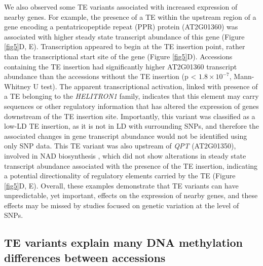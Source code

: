 \documentclass[12pt]{article}
\begin{document}
We also observed some TE variants associated with increased expression
of nearby genes. For example, the presence of a TE within the upstream
region of a gene encoding a pentatricopeptide repeat (PPR) protein
(AT2G01360) was associated with higher steady state transcript abundance
of this gene (Figure \ref{fig5}D, E). Transcription appeared to begin at the TE
insertion point, rather than the transcriptional start site of the gene
(Figure \ref{fig5}D). Accessions containing the TE insertion had significantly
higher AT2G01360 transcript abundance than the accessions without the TE
insertion (p \textless{} $1.8\times10^{-7}$, Mann-Whitney U test). The apparent
transcriptional activation, linked with presence of a TE belonging to
the \emph{HELITRON1} family, indicates that this element may carry
sequences or other regulatory information that has altered the
expression of genes downstream of the TE insertion site. Importantly,
this variant was classified as a low-LD TE insertion, as it is not in LD
with surrounding SNPs, and therefore the associated changes in gene
transcript abundance would not be identified using only SNP data. This
TE variant was also upstream of \emph{QPT }(AT2G01350), involved in NAD
biosynthesis \cite{Katoh:2006if}, which did not show alterations in
steady state transcript abundance associated with the presence of the TE
insertion, indicating a potential directionality of regulatory elements
carried by the TE (Figure \ref{fig5}D, E). Overall, these examples demonstrate
that TE variants can have unpredictable, yet important, effects on the
expression of nearby genes, and these effects may be missed by studies
focused on genetic variation at the level of SNPs.

\subsection{TE variants explain many DNA methylation differences between
accessions}
\end{document}
